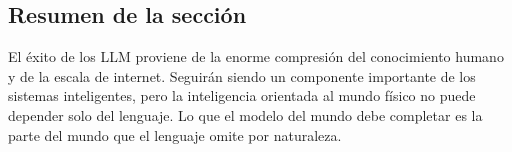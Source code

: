 \subsection{Resumen de la sección}

El éxito de los LLM proviene de la enorme compresión del conocimiento humano y de la escala de internet. Seguirán siendo un componente importante de los sistemas inteligentes, pero la inteligencia orientada al mundo físico no puede depender solo del lenguaje. Lo que el modelo del mundo debe completar es la parte del mundo que el lenguaje omite por naturaleza.
